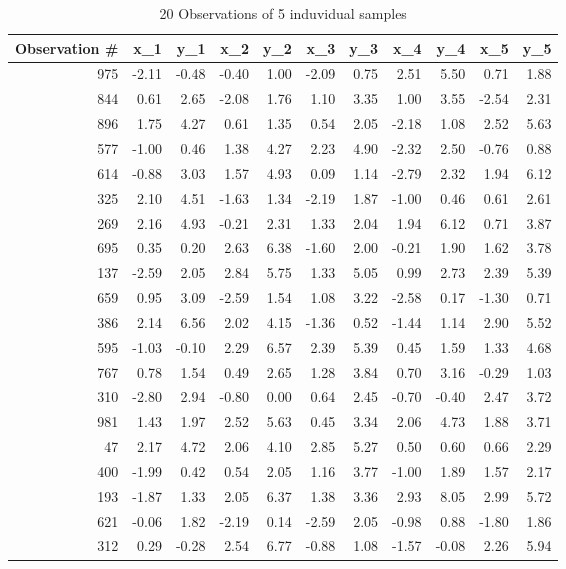 \documentclass{article}
\begin{document}
\begin{table}[ht]
\caption{20 Observations of 5 induvidual samples}
\centering
\begin{tabular}{rrrrrrrrrrr}
  \hline
 Observation \# & x_{1} & y_{1} & x_{2} & y_{2} & x_{3} & y_{3} & x_{4} & y_{4} & x_{5} & y_{5} \\ 
  \hline
975 & -2.11 & -0.48 & -0.40 & 1.00 & -2.09 & 0.75 & 2.51 & 5.50 & 0.71 & 1.88 \\ 
  844 & 0.61 & 2.65 & -2.08 & 1.76 & 1.10 & 3.35 & 1.00 & 3.55 & -2.54 & 2.31 \\ 
  896 & 1.75 & 4.27 & 0.61 & 1.35 & 0.54 & 2.05 & -2.18 & 1.08 & 2.52 & 5.63 \\ 
  577 & -1.00 & 0.46 & 1.38 & 4.27 & 2.23 & 4.90 & -2.32 & 2.50 & -0.76 & 0.88 \\ 
  614 & -0.88 & 3.03 & 1.57 & 4.93 & 0.09 & 1.14 & -2.79 & 2.32 & 1.94 & 6.12 \\ 
  325 & 2.10 & 4.51 & -1.63 & 1.34 & -2.19 & 1.87 & -1.00 & 0.46 & 0.61 & 2.61 \\ 
  269 & 2.16 & 4.93 & -0.21 & 2.31 & 1.33 & 2.04 & 1.94 & 6.12 & 0.71 & 3.87 \\ 
  695 & 0.35 & 0.20 & 2.63 & 6.38 & -1.60 & 2.00 & -0.21 & 1.90 & 1.62 & 3.78 \\ 
  137 & -2.59 & 2.05 & 2.84 & 5.75 & 1.33 & 5.05 & 0.99 & 2.73 & 2.39 & 5.39 \\ 
  659 & 0.95 & 3.09 & -2.59 & 1.54 & 1.08 & 3.22 & -2.58 & 0.17 & -1.30 & 0.71 \\ 
  386 & 2.14 & 6.56 & 2.02 & 4.15 & -1.36 & 0.52 & -1.44 & 1.14 & 2.90 & 5.52 \\ 
  595 & -1.03 & -0.10 & 2.29 & 6.57 & 2.39 & 5.39 & 0.45 & 1.59 & 1.33 & 4.68 \\ 
  767 & 0.78 & 1.54 & 0.49 & 2.65 & 1.28 & 3.84 & 0.70 & 3.16 & -0.29 & 1.03 \\ 
  310 & -2.80 & 2.94 & -0.80 & 0.00 & 0.64 & 2.45 & -0.70 & -0.40 & 2.47 & 3.72 \\ 
  981 & 1.43 & 1.97 & 2.52 & 5.63 & 0.45 & 3.34 & 2.06 & 4.73 & 1.88 & 3.71 \\ 
  47 & 2.17 & 4.72 & 2.06 & 4.10 & 2.85 & 5.27 & 0.50 & 0.60 & 0.66 & 2.29 \\ 
  400 & -1.99 & 0.42 & 0.54 & 2.05 & 1.16 & 3.77 & -1.00 & 1.89 & 1.57 & 2.17 \\ 
  193 & -1.87 & 1.33 & 2.05 & 6.37 & 1.38 & 3.36 & 2.93 & 8.05 & 2.99 & 5.72 \\ 
  621 & -0.06 & 1.82 & -2.19 & 0.14 & -2.59 & 2.05 & -0.98 & 0.88 & -1.80 & 1.86 \\ 
  312 & 0.29 & -0.28 & 2.54 & 6.77 & -0.88 & 1.08 & -1.57 & -0.08 & 2.26 & 5.94 \\ 
   \hline
\end{tabular}
\end{table}\\
\end{document}
